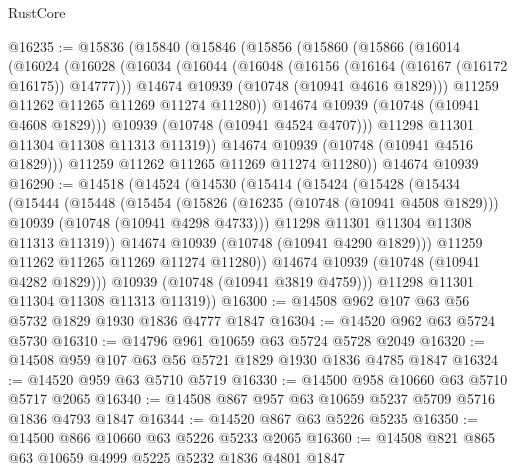 \begin{lexlean}{RustCore}
\begin{coremodule}
@16235 := @15836
    (@15840
      (@15846
        (@15856
          (@15860
            (@15866
              (@16014
                (@16024
                  (@16028
                    (@16034
                      (@16044
                        (@16048 (@16156 (@16164 (@16167 (@16172 @16175)) @14777)))
                        @14674
                        @10939
                        (@10748 (@10941 @4616 @1829)))
                      @11259
                      @11262
                      @11265
                      @11269
                      @11274
                      @11280))
                  @14674
                  @10939
                  (@10748 (@10941 @4608 @1829)))
                @10939
                (@10748 (@10941 @4524 @4707)))
              @11298
              @11301
              @11304
              @11308
              @11313
              @11319))
          @14674
          @10939
          (@10748 (@10941 @4516 @1829)))
        @11259
        @11262
        @11265
        @11269
        @11274
        @11280))
    @14674
    @10939
@16290 := @14518
    (@14524
      (@14530
        (@15414
          (@15424
            (@15428
              (@15434
                (@15444
                  (@15448
                    (@15454
                      (@15826
                        (@16235 (@10748 (@10941 @4508 @1829)))
                        @10939
                        (@10748 (@10941 @4298 @4733)))
                      @11298
                      @11301
                      @11304
                      @11308
                      @11313
                      @11319))
                  @14674
                  @10939
                  (@10748 (@10941 @4290 @1829)))
                @11259
                @11262
                @11265
                @11269
                @11274
                @11280))
            @14674
            @10939
            (@10748 (@10941 @4282 @1829)))
          @10939
          (@10748 (@10941 @3819 @4759)))
        @11298
        @11301
        @11304
        @11308
        @11313
        @11319))
@16300 := @14508 @962 @107 @63 @56 @5732 @1829 @1930 @1836 @4777 @1847
@16304 := @14520 @962 @63 @5724 @5730
@16310 := @14796 @961 @10659 @63 @5724 @5728 @2049
@16320 := @14508 @959 @107 @63 @56 @5721 @1829 @1930 @1836 @4785 @1847
@16324 := @14520 @959 @63 @5710 @5719
@16330 := @14500 @958 @10660 @63 @5710 @5717 @2065
@16340 := @14508 @867 @957 @63 @10659 @5237 @5709 @5716 @1836 @4793 @1847
@16344 := @14520 @867 @63 @5226 @5235
@16350 := @14500 @866 @10660 @63 @5226 @5233 @2065
@16360 := @14508 @821 @865 @63 @10659 @4999 @5225 @5232 @1836 @4801 @1847

\end{coremodule}
\end{lexlean}
